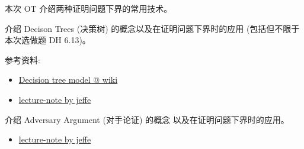 \documentclass[a4paper, justified]{tufte-handout}
\begin{document}
\begin{problem}[TC Problem 3-3 (a)]
\end{problem}

\begin{solution}
\end{solution}

\beginoptional

\begin{problem}[DH Problem 6.13]
\end{problem}

\begin{solution}
\end{solution}

\beginot

本次 OT 介绍两种证明问题下界的常用技术。

\begin{ot}
  介绍 Decison Trees (决策树) 的概念以及在证明问题下界时的应用
  (包括但不限于本次选做题 DH 6.13)。

  参考资料:
  \begin{itemize}
    \item \href{https://en.wikipedia.org/wiki/Decision\_tree\_model}{Decision tree model @ wiki}
    \item \href{http://jeffe.cs.illinois.edu/teaching/algorithms/notes/12-lowerbounds.pdf}{lecture-note by jeffe}
  \end{itemize}
\end{ot}

\vspace{0.50cm}
\begin{ot}
  介绍 Adversary Argument (对手论证) 的概念
  以及在证明问题下界时的应用。

  \begin{itemize}
    \item \href{http://jeffe.cs.illinois.edu/teaching/algorithms/notes/13-adversary.pdf}{lecture-note by jeffe}
  \end{itemize}
\end{ot}




\beginfb

\end{document}
